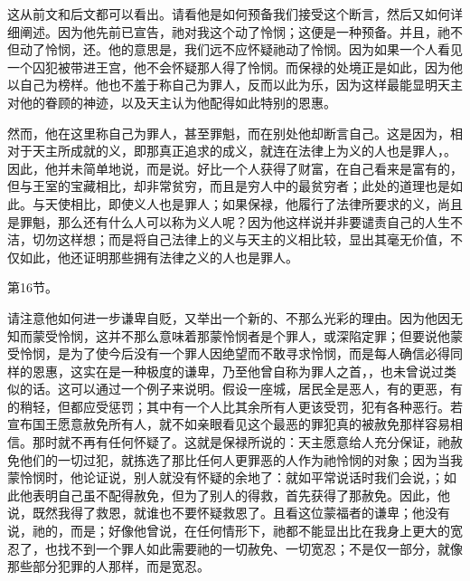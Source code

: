 这从前文和后文都可以看出。请看他是如何预备我们接受这个断言，然后又如何详细阐述。因为他先前已宣告，祂对我这个动了怜悯；这便是一种预备。并且，祂不但动了怜悯，还。他的意思是，我们远不应怀疑祂动了怜悯。因为如果一个人看见一个囚犯被带进王宫，他不会怀疑那人得了怜悯。而保禄的处境正是如此，因为他以自己为榜样。他也不羞于称自己为罪人，反而以此为乐，因为这样最能显明天主对他的眷顾的神迹，以及天主认为他配得如此特别的恩惠。\par

然而，他在这里称自己为罪人，甚至罪魁，而在别处他却断言自己。这是因为，相对于天主所成就的义，即那真正追求的成义，就连在法律上为义的人也是罪人，。因此，他并未简单地说，而是说。好比一个人获得了财富，在自己看来是富有的，但与王室的宝藏相比，却非常贫穷，而且是穷人中的最贫穷者；此处的道理也是如此。与天使相比，即使义人也是罪人；如果保禄，他履行了法律所要求的义，尚且是罪魁，那么还有什么人可以称为义人呢？因为他这样说并非要谴责自己的人生不洁，切勿这样想；而是将自己法律上的义与天主的义相比较，显出其毫无价值，不仅如此，他还证明那些拥有法律之义的人也是罪人。\par

第16节。\par

请注意他如何进一步谦卑自贬，又举出一个新的、不那么光彩的理由。因为他因无知而蒙受怜悯，这并不那么意味着那蒙怜悯者是个罪人，或深陷定罪；但要说他蒙受怜悯，是为了使今后没有一个罪人因绝望而不敢寻求怜悯，而是每人确信必得同样的恩惠，这实在是一种极度的谦卑，乃至他曾自称为罪人之首，，也未曾说过类似的话。这可以通过一个例子来说明。假设一座城，居民全是恶人，有的更恶，有的稍轻，但都应受惩罚；其中有一个人比其余所有人更该受罚，犯有各种恶行。若宣布国王愿意赦免所有人，就不如亲眼看见这个最恶的罪犯真的被赦免那样容易相信。那时就不再有任何怀疑了。这就是保禄所说的：天主愿意给人充分保证，祂赦免他们的一切过犯，就拣选了那比任何人更罪恶的人作为祂怜悯的对象；因为当我蒙怜悯时，他论证说，别人就没有怀疑的余地了：就如平常说话时我们会说，；如此他表明自己虽不配得赦免，但为了别人的得救，首先获得了那赦免。因此，他说，既然我得了救恩，就谁也不要怀疑救恩了。且看这位蒙福者的谦卑；他没有说，祂的，而是；好像他曾说，在任何情形下，祂都不能显出比在我身上更大的宽忍了，也找不到一个罪人如此需要祂的一切赦免、一切宽忍；不是仅一部分，就像那些部分犯罪的人那样，而是宽忍。\par

